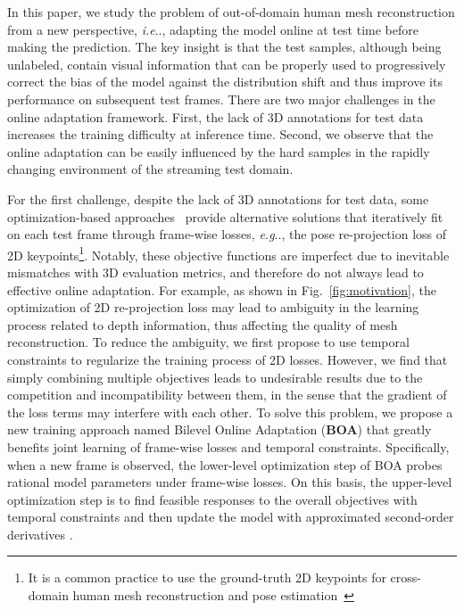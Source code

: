 \documentclass[10pt,journal,compsoc]{IEEEtran}
\makeatletter
\DeclareRobustCommand\onedot{\futurelet\@let@token\@onedot}
\def\@onedot{\ifx\@let@token.\else.\null\fi\xspace}
\def\eg{\emph{e.g}\onedot} \def\Eg{\emph{E.g}\onedot}
\def\ie{\emph{i.e}\onedot} \def\Ie{\emph{I.e}\onedot}
\newcommand{\fig}[1]{Fig.~\ref{#1}}
\makeatother
\begin{document}
In this paper, we study the problem of out-of-domain human mesh reconstruction from a new perspective, \ie, adapting the model online at test time before making the prediction.
The key insight is that the test samples, although being unlabeled, contain visual information that can be properly used to progressively correct the bias of the model against the distribution shift and thus improve its performance on subsequent test frames.
There are two major challenges in the online adaptation framework. First, the lack of 3D annotations for test data increases the training difficulty at inference time. 
Second, we observe that the online adaptation can be easily influenced by the hard samples in the rapidly changing environment of the streaming test domain. 



For the first challenge, despite the lack of 3D annotations for test data, some optimization-based approaches~\cite{joo2020eft,bogo2016keep,SMPL-X:2019} provide alternative solutions that iteratively fit on each test frame through frame-wise losses, \eg, the pose re-projection loss of 2D keypoints\footnote{It is a common practice to use the ground-truth 2D keypoints for cross-domain human mesh reconstruction and pose estimation~\cite{joo2020eft,zhang2020inference,gong2021poseaug}}.
Notably, these objective functions are imperfect due to inevitable mismatches with 3D evaluation metrics, and therefore do not always lead to effective online adaptation.
For example, as shown in \fig{fig:motivation}, the optimization of 2D re-projection loss may lead to ambiguity in the learning process related to depth information, thus affecting the quality of mesh reconstruction.
To reduce the ambiguity, we first propose to use temporal constraints to regularize the training process of 2D losses.
However, we find that simply combining multiple objectives leads to undesirable results due to the competition and incompatibility between them, in the sense that the gradient of the loss terms may interfere with each other.
To solve this problem, we propose a new training approach named Bilevel Online Adaptation (\textbf{BOA}) that greatly benefits joint learning of frame-wise losses and temporal constraints.
Specifically, when a new frame is observed, the lower-level optimization step of BOA probes rational model parameters under frame-wise losses. On this basis, the upper-level optimization step is to find feasible responses to the overall objectives with temporal constraints and then update the model with approximated second-order derivatives \cite{finn2017model}.
\end{document}
